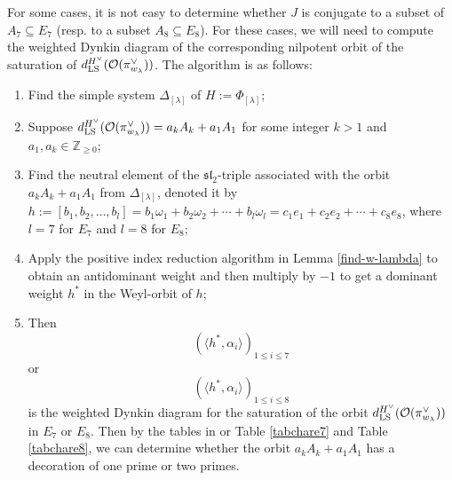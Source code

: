\documentclass[reqno,12pt]{amsart}
\numberwithin{equation}{section}
\theoremstyle{plain}
\theoremstyle{definition}
\renewcommand{\subset}{\subseteq}
\newcommand{\lest}{\leqslant}
\renewcommand{\geq}{\geqslant}
\begin{document}
For some cases, it is not easy to determine whether $J$ is conjugate to a subset of $A_7\subset E_7$ (resp. to a subset $A_8\subset E_8$). For these cases, we will need to compute the weighted Dynkin diagram of the corresponding nilpotent orbit of the saturation of $d_{\rm LS}^{H^\vee}(\mathcal{O}(\pi_{w_\lambda}^\vee))$. The algorithm is as follows:
\begin{enumerate}
    \item Find the simple system $\Delta_{[\lambda]}$ of $H:=\Phi_{[\lambda]}$;
    \item Suppose $d_{\rm LS}^{H^\vee}(\mathcal{O}(\pi_{w_\lambda}^\vee))=a_kA_k+a_1A_1$ for some integer $k>1$ and $a_1,a_k\in \mathbb{Z}_{\geq 0}$;
    \item Find  the neutral element of the $\mathfrak{sl}_2$-triple associated with the orbit $a_kA_k+a_1A_1$ from $\Delta_{[\lambda]}$, denoted it by $h:=[b_1,b_2,\dots,b_l]=b_1\omega_1+b_2\omega_2+\cdots+b_l\omega_l=c_1e_1+c_2e_2+\cdots+c_8e_8$, where $l=7$ for $E_7$ and $l=8$ for $E_8$;
    \item Apply the positive index reduction algorithm in Lemma \ref{find-w-lambda} to obtain an antidominant weight and then multiply by $-1$ to get a dominant weight $h^*$ in the Weyl-orbit of $h$;
    \item Then  
    $$(\langle h^*, \alpha_i \rangle)_{1\lest i \lest 7}$$
    or $$(\langle h^*, \alpha_i \rangle)_{1\lest i \lest 8}$$ is the weighted Dynkin diagram for the saturation of the orbit $d_{\rm LS}^{H^\vee}(\mathcal{O}(\pi_{w_\lambda}^\vee))$ in $E_7$ or $E_8$. Then by the tables in \cite{som-98} or Table \ref{tabchare7} and Table \ref{tabchare8}, we can determine whether the orbit $a_kA_k+a_1A_1$ has a decoration of one prime or two primes.
\end{enumerate}
\end{document}

